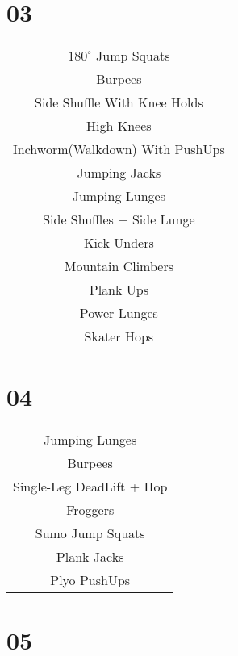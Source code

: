 \documentclass[12pt]{article}
\newcommand\myPadding{1.5}
\begin{document}

\section{03}



\begin{center}
  \bgroup
  \def\arraystretch{\myPadding}%
  \begin{tabular}{ c  }
$180^{\circ}$ Jump Squats
\\
Burpees
\\
Side Shuffle With Knee Holds
\\
High Knees
\\
Inchworm(Walkdown) With PushUps
\\
Jumping Jacks
\\
Jumping Lunges
\\
Side Shuffles + Side Lunge
\\
Kick Unders
\\
Mountain Climbers
\\
Plank Ups
\\
Power Lunges
\\
Skater Hops
  \end{tabular}
  \egroup
\end{center}





\section{04}


\begin{center}
  \bgroup
  \def\arraystretch{\myPadding}%
  \begin{tabular}{ c  }
Jumping Lunges
\\
Burpees
\\
Single-Leg DeadLift + Hop
\\
Froggers
\\
Sumo Jump Squats
\\
Plank Jacks
\\
Plyo PushUps
  \end{tabular}
  \egroup
\end{center}





\section{05}
\end{document}
